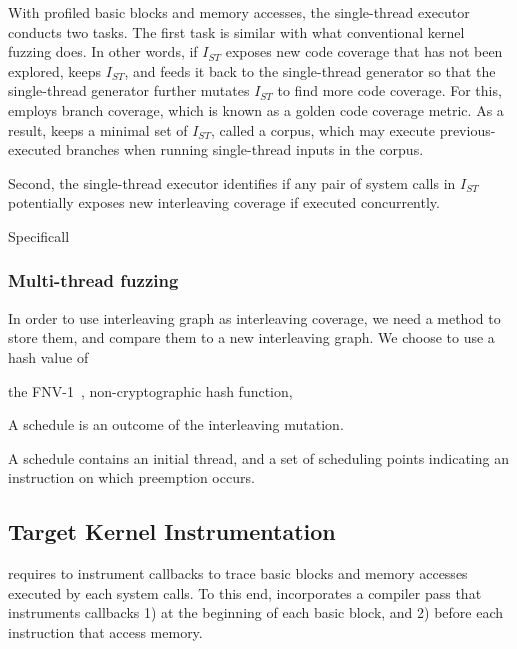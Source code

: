 With profiled basic blocks and memory accesses, the single-thread
executor conducts two tasks.
%
The first task is similar with what conventional kernel fuzzing
does. In other words, if $I_{ST}$ exposes new code coverage that has
not been explored, \sys keeps $I_{ST}$, and feeds it back to the
single-thread generator so that the single-thread generator further
mutates $I_{ST}$ to find more code coverage.
%
For this, \sys employs branch coverage, which is known as a golden
code coverage metric.
%
As a result, \sys keeps a minimal set of $I_{ST}$, called a corpus,
which may execute previous-executed branches when running
single-thread inputs in the corpus.


Second, the single-thread executor identifies if any pair of system
calls in $I_{ST}$ potentially exposes new interleaving coverage if
executed concurrently.
%

Specificall


\subsubsection{Multi-thread fuzzing}

%
In order to use interleaving graph as interleaving coverage, we need a
method to store them, and compare them to a new interleaving graph.
%
We choose to use a hash value of

the FNV-1~\cite{fnv, fnv-go}, non-cryptographic hash function,


A schedule is an outcome of the interleaving mutation.

A schedule contains an initial thread, and a set of scheduling points
indicating an instruction on which preemption occurs.








\subsection{Target Kernel Instrumentation}
\label{ss:instrumentation}

\sys requires to instrument callbacks to trace basic blocks and memory
accesses executed by each system calls.
%
To this end, \sys incorporates a compiler pass that instruments
callbacks 1) at the beginning of each basic block, and 2) before each
instruction that access memory.
%





